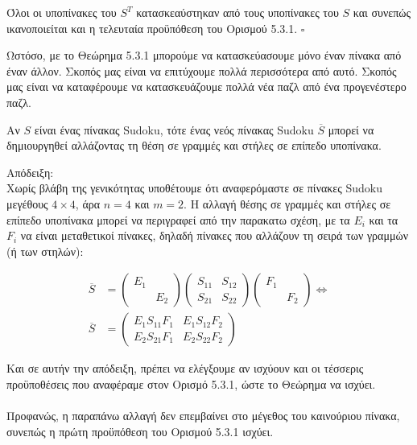 \documentclass[oneside,12pt]{book}
\theoremstyle{definition}
\begin{document}
Όλοι οι υποπίνακες του \(S^{T}\) κατασκεαύστηκαν από τους υποπίνακες του \(S\) και συνεπώς ικανοποιείται και η τελευταία προϋπόθεση του Ορισμού 5.3.1. \(\square\)

Ωστόσο, με το Θεώρημα 5.3.1 μπορούμε να κατασκεύασουμε μόνο έναν πίνακα από έναν άλλον. Σκοπός μας είναι να επιτύχουμε πολλά περισσότερα από αυτό. Σκοπός μας είναι να καταφέρουμε να κατασκευάζουμε πολλά νέα παζλ από ένα προγενέστερο παζλ.

\begin{theorem}{}{}
	Αν \(S\) είναι ένας πίνακας Sudoku, τότε ένας νεός πίνακας Sudoku \(\overline{S}\) μπορεί να δημιουργηθεί αλλάζοντας τη θέση σε γραμμές και στήλες σε επίπεδο υποπίνακα.
\end{theorem}

Απόδειξη: \\
Χωρίς βλάβη της γενικότητας υποθέτουμε ότι αναφερόμαστε σε πίνακες Sudoku μεγέθους \(4 \times 4\), άρα \(n = 4\) και \(m = 2\). Η αλλαγή θέσης σε γραμμές και στήλες σε επίπεδο υποπίνακα μπορεί να περιγραφεί από την παρακατω σχέση, με τα \(E_{i}\) και τα \(F_{i}\) να είναι μεταθετικοί πίνακες, δηλαδή πίνακες που αλλάζουν τη σειρά των γραμμών (ή των στηλών):

\begin{align}
	\overline{S} &= \begin{pmatrix}
						E_{1} &  \\
							  & E_{2}
	\end{pmatrix}
	\begin{pmatrix}
		S_{11} & S_{12} \\
		S_{21} & S_{22}
	\end{pmatrix}
	\begin{pmatrix}
		F_{1} &  \\
		& F_{2}
	\end{pmatrix} \Leftrightarrow \\
	\overline{S} &= \begin{pmatrix}
						E_{1}S_{11}F_{1} & E_{1}S_{12}F_{2} \\
						E_{2}S_{21}F_{1} & E_{2}S_{22}F_{2}
					\end{pmatrix}
\end{align}

Και σε αυτήν την απόδειξη, πρέπει να ελέγξουμε αν ισχύουν και οι τέσσερις προϋποθέσεις που αναφέραμε στον Ορισμό 5.3.1, ώστε το Θεώρημα να ισχύει. \\ \\

Προφανώς, η παραπάνω αλλαγή δεν επεμβαίνει στο μέγεθος του καινούριου πίνακα, συνεπώς η πρώτη προϋπόθεση του Ορισμού 5.3.1 ισχύει. \\
\end{document}
